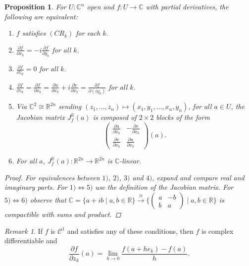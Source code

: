 \documentclass[12pt]{article}
\theoremstyle{darkgreentheorem}
\newtheorem{prop}[thm]{Proposition}
\theoremstyle{darkbluedefinition}
\theoremstyle{darkredexample}
\theoremstyle{remark}
\newtheorem{rem}[thm]{Remark}
\newcommand{\R}{\mathbb{R}}
\newcommand{\1}{\mathbbm{1}}
\newcommand{\C}{\mathbb{C}}
\newcommand{\calC}{\mathcal{C}}
\begin{document}
\begin{prop}
    For $U\colon \C^{n}$ open and $f\colon U\to \C$ with partial derivatives, the following are equivalent:
    \begin{enumerate}[label=\arabic*)]
	\item $f$ satisfies $(CR_{k})$ for each $k$.
	\item $\frac{\partial f}{\partial x_{k}}=-i\frac{\partial f}{\partial y_{k}}$ for all $k$.
	\item $\frac{\partial f}{\partial \bar{z}_{k}}=0$ for all $k$.
	\item $\frac{\partial f}{\partial z_{k}}=\frac{\partial f}{\partial x_{k}}=\frac{\partial u}{\partial x_{k}}+i\frac{\partial v}{\partial x_{k}}=\frac{\partial f}{\partial (iy_{k})}$ for all $k$.
	\item Via $\C^{2}\cong \R^{2n}$ sending $(z_{1},\ldots,z_{n})\mapsto (x_{1},y_{1},\ldots, x_{n},y_{n})$, for all $a\in U$, the Jacobian matrix  $J_{f}^{\R}(a)$ is composed of $2\times 2$ blocks of the form
	    \[ \begin{pmatrix} \frac{\partial u}{\partial x_{k}} & -\frac{\partial v}{\partial x_{k}} \\ \frac{\partial v}{\partial x_{k}} & \frac{\partial u}{\partial x_{k}}
	    \end{pmatrix}(a).\]
	\item For all $a$, $J_{f}^{\R}(a)\colon \R^{2n}\to \R^{2n}$ is $\C$-linear.
    \end{enumerate}
    \begin{proof}
	For equivalences between $1)$, $2)$, $3)$ and $4)$, expand and compare real and imaginary parts.
	For $1)\Leftrightarrow 5)$ use the definition of the Jacobian matrix.
	For $5)\Leftrightarrow 6)$ observe that $\C=\{a+ib\mid a,b\in \R\} \xrightarrow{\cong} \{ \begin{pmatrix} a & -b \\ b & a \end{pmatrix} \mid a,b\in \R\}$ is compactible with sums and product.
    \end{proof}
\end{prop}

\begin{rem}
    If $f$ is $\calC^{1}$ and satisfies any of these conditions, then $f$ is complex differentiable and
    \[ \frac{\partial f}{\partial z_{k}}(a)=\lim_{h\to 0}\frac{f(a+he_{k})-f(a)}{h}.\]
\end{rem}
\end{document}

